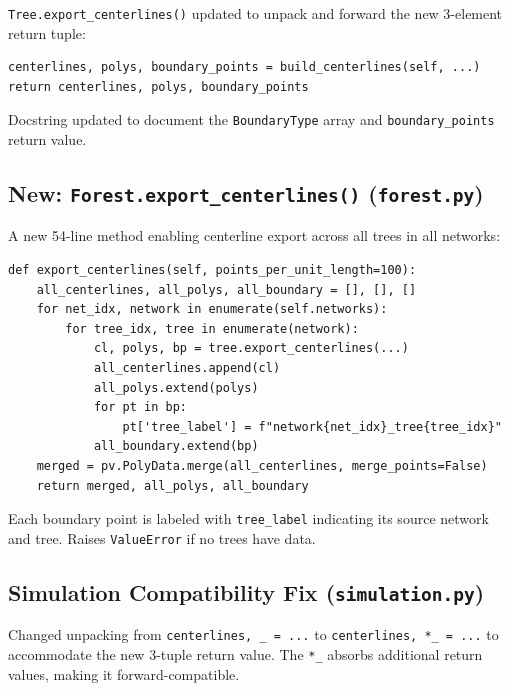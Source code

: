 \documentclass[11pt,a4paper]{article}
\begin{document}
\texttt{Tree.export\_centerlines()} updated to unpack and forward the new 3-element return tuple:
\begin{lstlisting}
centerlines, polys, boundary_points = build_centerlines(self, ...)
return centerlines, polys, boundary_points
\end{lstlisting}

Docstring updated to document the \texttt{BoundaryType} array and \texttt{boundary\_points} return value.

\subsection{New: \texttt{Forest.export\_centerlines()} (\texttt{forest.py})}

A new 54-line method enabling centerline export across all trees in all networks:

\begin{lstlisting}
def export_centerlines(self, points_per_unit_length=100):
    all_centerlines, all_polys, all_boundary = [], [], []
    for net_idx, network in enumerate(self.networks):
        for tree_idx, tree in enumerate(network):
            cl, polys, bp = tree.export_centerlines(...)
            all_centerlines.append(cl)
            all_polys.extend(polys)
            for pt in bp:
                pt['tree_label'] = f"network{net_idx}_tree{tree_idx}"
            all_boundary.extend(bp)
    merged = pv.PolyData.merge(all_centerlines, merge_points=False)
    return merged, all_polys, all_boundary
\end{lstlisting}

Each boundary point is labeled with \texttt{tree\_label} indicating its source network and tree. Raises \texttt{ValueError} if no trees have data.

\subsection{Simulation Compatibility Fix (\texttt{simulation.py})}

Changed unpacking from \texttt{centerlines, \_ = ...} to \texttt{centerlines, *\_ = ...} to accommodate the new 3-tuple return value. The \texttt{*\_} absorbs additional return values, making it forward-compatible.
\end{document}
